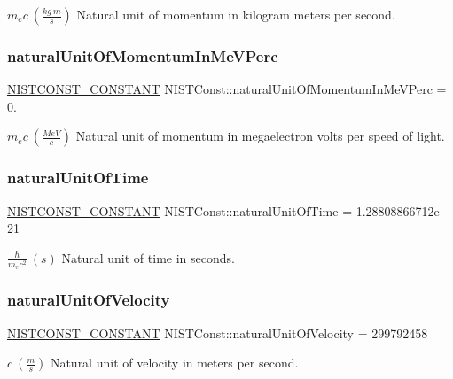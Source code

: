 $m_e c \ (\frac{kg\ m}{s})$ Natural unit of momentum in kilogram meters per second. \mbox{\label{group___n_i_s_t_const-_natural_unit_ga1768d322c0f9342d6fb5a30d1158a6ca}} 
\subsubsection{\texorpdfstring{natural\+Unit\+Of\+Momentum\+In\+Me\+V\+Perc}{naturalUnitOfMomentumInMeVPerc}}
{\footnotesize\ttfamily \mbox{\hyperlink{_n_i_s_t_const_8hpp_a2b0fc1d7452373f816175dd86ce26729}{N\+I\+S\+T\+C\+O\+N\+S\+T\+\_\+\+C\+O\+N\+S\+T\+A\+NT}} N\+I\+S\+T\+Const\+::natural\+Unit\+Of\+Momentum\+In\+Me\+V\+Perc = 0.}

$m_e c \ (\frac{MeV}{c})$ Natural unit of momentum in megaelectron volts per speed of light. \mbox{\label{group___n_i_s_t_const-_natural_unit_gab65c3f69b157abb96800734bdc63f25d}} 
\subsubsection{\texorpdfstring{natural\+Unit\+Of\+Time}{naturalUnitOfTime}}
{\footnotesize\ttfamily \mbox{\hyperlink{_n_i_s_t_const_8hpp_a2b0fc1d7452373f816175dd86ce26729}{N\+I\+S\+T\+C\+O\+N\+S\+T\+\_\+\+C\+O\+N\+S\+T\+A\+NT}} N\+I\+S\+T\+Const\+::natural\+Unit\+Of\+Time = 1.\+28808866712e-\/21}

$\frac{\hbar}{m_e c^2} \ (s)$ Natural unit of time in seconds. \mbox{\label{group___n_i_s_t_const-_natural_unit_ga89a69b160a137580df146f4407c5290b}} 
\subsubsection{\texorpdfstring{natural\+Unit\+Of\+Velocity}{naturalUnitOfVelocity}}
{\footnotesize\ttfamily \mbox{\hyperlink{_n_i_s_t_const_8hpp_a2b0fc1d7452373f816175dd86ce26729}{N\+I\+S\+T\+C\+O\+N\+S\+T\+\_\+\+C\+O\+N\+S\+T\+A\+NT}} N\+I\+S\+T\+Const\+::natural\+Unit\+Of\+Velocity = 299792458}

$c \ (\frac{m}{s})$ Natural unit of velocity in meters per second. 